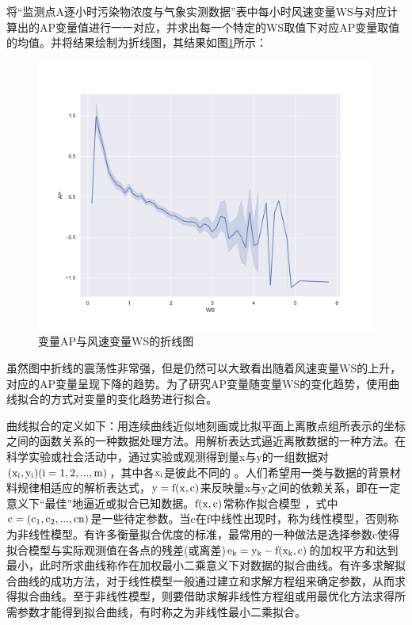 \documentclass[bwprint]{gmcmthesis}
\numberwithin{figure}{section}
\begin{document}
	将“监测点A逐小时污染物浓度与气象实测数据”表中每小时风速变量WS与对应计算出的AP变量值进行一一对应，并求出每一个特定的WS取值下对应AP变量取值的均值。并将结果绘制为折线图，其结果如图\ref{fig3-5}所示：
	\begin{figure}[!h]
		\centering
		\includegraphics[width=.7\textwidth]{figures//fig_WS.png}
		\caption{变量AP与风速变量WS的折线图}
		\label{fig3-5}
	\end{figure}

虽然图中折线的震荡性非常强，但是仍然可以大致看出随着风速变量WS的上升，对应的AP变量呈现下降的趋势。为了研究AP变量随变量WS的变化趋势，使用曲线拟合的方式对变量的变化趋势进行拟合。

曲线拟合的定义如下：用连续曲线近似地刻画或比拟平面上离散点组所表示的坐标之间的函数关系的一种数据处理方法。用解析表达式逼近离散数据的一种方法。在科学实验或社会活动中，通过实验或观测得到量x与y的一组数据对$\rm (x_i,y_i)(i=1,2,...,m)$，其中各$\rm x_i$是彼此不同的 。人们希望用一类与数据的背景材料规律相适应的解析表达式，$\rm y=f(x,c)$来反映量x与y之间的依赖关系，即在一定意义下“最佳”地逼近或拟合已知数据。$\rm f(x,c)$常称作拟合模型 ，式中$\rm c=(c_1,c_2,...,cn)$是一些待定参数。当c在f中线性出现时，称为线性模型，否则称为非线性模型。有许多衡量拟合优度的标准，最常用的一种做法是选择参数c使得拟合模型与实际观测值在各点的残差(或离差)$\rm e_k=y_k-f(x_k,c)$的加权平方和达到最小，此时所求曲线称作在加权最小二乘意义下对数据的拟合曲线。有许多求解拟合曲线的成功方法，对于线性模型一般通过建立和求解方程组来确定参数，从而求得拟合曲线。至于非线性模型，则要借助求解非线性方程组或用最优化方法求得所需参数才能得到拟合曲线，有时称之为非线性最小二乘拟合。
\end{document}
